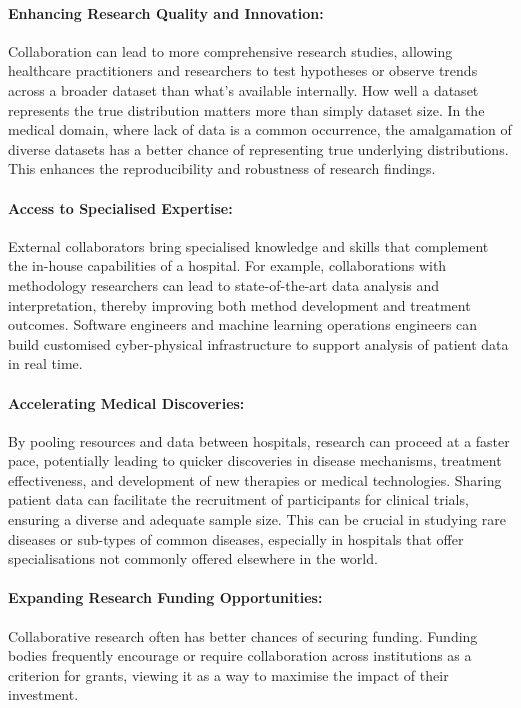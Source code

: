 \documentclass[11pt]{article}
\begin{document}
\paragraph{Enhancing Research Quality and Innovation:} 
Collaboration can lead to more comprehensive research studies, allowing healthcare practitioners and researchers to test hypotheses or observe trends across a broader dataset than what's available internally. How well a dataset represents the true distribution matters more than simply dataset size\cite{app11020796}. In the medical domain, where lack of data is a common occurrence, the amalgamation of diverse datasets has a better chance of representing true underlying distributions. This enhances the reproducibility and robustness of research findings.

\paragraph{Access to Specialised Expertise:} 
External collaborators bring specialised knowledge and skills that complement the in-house capabilities of a hospital. For example, collaborations with methodology researchers can lead to state-of-the-art data analysis and interpretation, thereby improving both method development and treatment outcomes. Software engineers and machine learning operations engineers can build customised cyber-physical infrastructure to support analysis of patient data in real time\cite{harris2022}.

\paragraph{Accelerating Medical Discoveries:}
By pooling resources and data between hospitals, research can proceed at a faster pace\cite{app11020796}, potentially leading to quicker discoveries in disease mechanisms, treatment effectiveness, and development of new therapies or medical technologies. Sharing patient data can facilitate the recruitment of participants for clinical trials, ensuring a diverse and adequate sample size. This can be crucial in studying rare diseases or sub-types of common diseases, especially in hospitals that offer specialisations not commonly offered elsewhere in the world. 

\paragraph{Expanding Research Funding Opportunities:} Collaborative research often has better chances of securing funding\cite{Vasan2021}. Funding bodies frequently encourage or require collaboration across institutions as a criterion for grants, viewing it as a way to maximise the impact of their investment.
\end{document}
